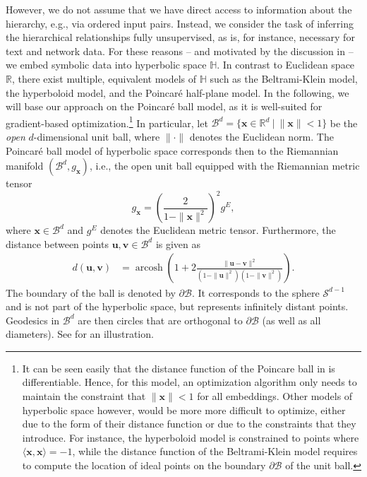 \documentclass[11pt]{article}
\renewcommand{\vec}[1]{\bm{#1}}
\newcommand{\vu}{\vec{u}}
\newcommand{\vv}{\vec{v}}
\newcommand{\vx}{\vec{x}}
\newcommand{\manifold}[1]{\mathcal{#1}}
\newcommand{\acosh}{\operatorname{arcosh}}
\newcommand{\dist}{d}
\newcommand{\hsp}{\mathbb{H}}
\newcommand{\R}{\mathbb{R}}
\begin{document}
However, we do not assume that we have direct access to information about the
hierarchy, e.g., via ordered input pairs. Instead, we consider the task of
inferring the hierarchical relationships fully unsupervised, as is, for
instance, necessary for text and network data. For these reasons -- and
motivated by the discussion in  -- we embed symbolic data
into hyperbolic space \(\hsp\). In contrast to Euclidean space \(\R\), there exist
multiple, equivalent models of \(\hsp\) such as the Beltrami-Klein model, the
hyperboloid model, and the Poincaré half-plane model. In the following, we will
base our approach on the Poincaré ball model, as it is well-suited for
gradient-based optimization.\footnote{It can be seen easily that the distance
function of the Poincare ball in  is differentiable. Hence,
for this model, an optimization algorithm only needs to maintain the constraint
that \(\|\vx\| < 1\) for all embeddings. Other models of hyperbolic space however,
would be more more difficult to optimize, either due to the form of their
distance function or due to the constraints that they introduce. For instance,
the hyperboloid model is constrained to points where \(\langle \vx, \vx \rangle = -1\), while
the distance function of the Beltrami-Klein model requires to compute the
location of ideal points on the boundary \(\partial \manifold{B}\) of the unit ball.} In
particular, let \({\manifold{B}^d = \{\vx \in \R^d\ |\ \|\vx\| < 1\}}\) be the \emph{open}
\(d\)-dimensional unit ball, where \(\|\cdot\|\) denotes the Euclidean norm. The
Poincaré ball model of hyperbolic space corresponds then to the Riemannian
manifold \((\manifold{B}^d, g_{\vx})\), i.e., the open unit ball equipped with the
Riemannian metric tensor
\begin{equation*}
  g_{\vx} = \left( \frac{2}{1 - \|\vx\|^2} \right)^2 g^E ,
\end{equation*}
where \(\vx \in \manifold{B}^d\) and \(g^E\) denotes the Euclidean metric tensor.
Furthermore, the distance between points \(\vu, \vv \in \manifold{B}^d\) is given as
\begin{align}
  \dist(\vu, \vv) & = \acosh\left(1 + 2\frac{\|\vu - \vv\|^2}{(1 - \|\vu\|^2)(1 - \|\vv\|^2)}\right) \label{eq:distance} .
\end{align}
The boundary of the ball is denoted by \(\partial\manifold{B}\). It corresponds to the
sphere \(\manifold{S}^{d-1}\) and is not part of the hyperbolic space, but represents
infinitely distant points. Geodesics in \(\manifold{B}^d\) are then circles that are
orthogonal to \(\partial \manifold{B}\) (as well as all diameters). See
 for an illustration.
\end{document}
